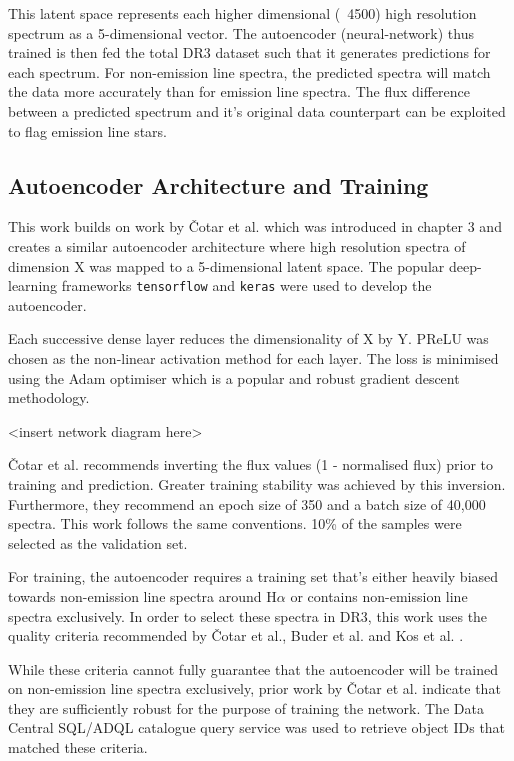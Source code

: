 This latent space represents each higher dimensional (~4500) high resolution spectrum as a 5-dimensional vector. The autoencoder (neural-network) thus trained is then fed the total DR3 dataset such that it generates predictions for each spectrum. For non-emission line spectra, the predicted spectra will match the data more accurately than for emission line spectra. The flux difference between a predicted spectrum and it's original data counterpart can be exploited to flag emission line stars.

\subsection{Autoencoder Architecture and Training}

This work builds on work by Čotar et al. which was introduced in chapter 3 and creates a similar autoencoder architecture where high resolution spectra of dimension X was mapped to a 5-dimensional latent space. The popular deep-learning frameworks \texttt{tensorflow} and \texttt{keras} were used to develop the autoencoder.

Each successive dense layer reduces the dimensionality of X by Y. PReLU was chosen as the non-linear activation method for each layer. The loss is minimised using the Adam optimiser which is a popular and robust gradient descent methodology. 

<insert network diagram here>

Čotar et al. recommends inverting the flux values (1 - normalised flux) prior to training and prediction. Greater training stability was achieved by this inversion. Furthermore, they recommend an epoch size of 350 and a batch size of 40,000 spectra. This work follows the same conventions. 10\% of the samples were selected as the validation set. 

For training, the autoencoder requires a training set that's either heavily biased towards non-emission line spectra around H$\alpha$ or contains non-emission line spectra exclusively. In order to select these spectra in DR3, this work uses the quality criteria recommended by Čotar et al., Buder et al. \cite{buder2021galah+} and Kos et al. \cite{kos2017galah}. 

While these criteria cannot fully guarantee that the autoencoder will be trained on non-emission line spectra exclusively, prior work by Čotar et al. indicate that they are sufficiently robust for the purpose of training the network. The Data Central SQL/ADQL catalogue query service was used to retrieve object IDs that matched these criteria.

